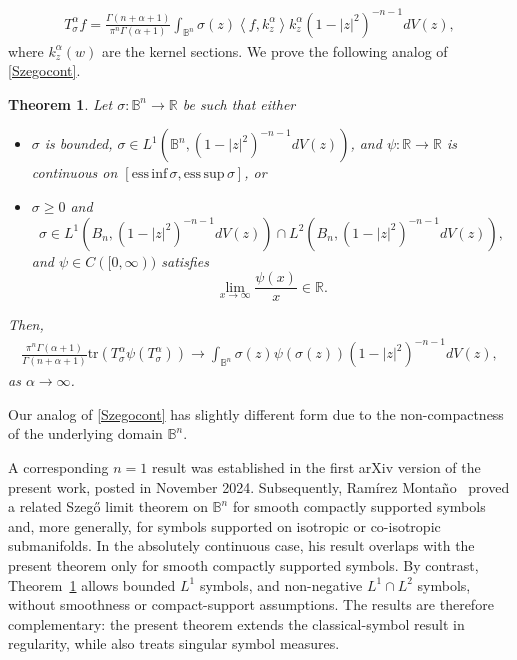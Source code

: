 \documentclass{amsart}
\newtheorem{thm}{Theorem}[section]
\theoremstyle{definition}
\theoremstyle{remark}
\numberwithin{equation}{section}
\newcommand{\ip}[2]{\left\langle {#1} , {#2} \right\rangle} %
\newcommand{\R}{\mathbb{R}} %
\newcommand{\D}{\mathbb{D}} %
\newcommand{\tr}{\text{tr}} %
\newcommand{\calF}{\mathcal{F}}
\begin{document}
\begin{align*}
    T_{\sigma}^{\alpha}f=\frac{\Gamma(n+\alpha+1)}{\pi^{n}\Gamma(\alpha+1)}\int_{\mathbb{B}^{n}}\sigma(z)\ip{f}{k_{z}^{\alpha}}k_{z}^{\alpha}(1-|z|^{2})^{-n-1}dV(z), 
\end{align*}
where $k_{z}^{\alpha}(w)$ are the kernel sections. We prove the following analog of \eqref{Szegocont}. 


\begin{thm}\label{Sze2} Let $\sigma:\mathbb{B}^{n}\to \R$ be such that either
\begin{itemize}
    \item[(a)] $\sigma$ is bounded, $\sigma\in L^{1}(\mathbb{B}^{n},(1-|z|^{2})^{-n-1}dV(z))$, and $\psi:\R \to \R$ is continuous on $[\mathrm{ess\,inf}\,\sigma,\mathrm{ess\,sup}\,\sigma]$, or 
    \item[(b)] $\sigma\geq0$ and
\[
\sigma\in
L^1\!\left(B_n,(1-|z|^2)^{-n-1}dV(z)\right)
\cap
L^2\!\left(B_n,(1-|z|^2)^{-n-1}dV(z)\right),
\]
and $\psi\in C([0,\infty))$ satisfies
\[
\lim_{x\to\infty}\frac{\psi(x)}{x}\in\mathbb{R}.
\]
\end{itemize}
Then, 
    \begin{align*}
        \frac{\pi^{n}\Gamma(\alpha+1)}{\Gamma(n+\alpha+1)}\tr\left(T_{\sigma}^{\alpha}\psi\left(T_{\sigma}^{\alpha}\right)\right)\to\int_{\mathbb{B}^{n}}\sigma(z)\psi\left(\sigma(z)\right)(1-|z|^{2})^{-n-1}dV(z),
    \end{align*}
    as $\alpha\to\infty$.
\end{thm}

\noindent Our analog of \eqref{Szegocont} has slightly different form due to the non-compactness of the underlying domain $\mathbb{B}^{n}$. 

A corresponding \(n=1\) result was established in the first arXiv
version of the present work, posted in November 2024. Subsequently,
Ram{\'i}rez Monta{\~n}o~\cite{RamirezMontano} proved a related
Szeg\H{o} limit theorem on \(\mathbb B^n\) for smooth compactly supported
symbols and, more generally, for symbols supported on isotropic or
co-isotropic submanifolds. In the absolutely continuous case, his result
overlaps with the present theorem only for smooth compactly supported
symbols. By contrast, Theorem~\ref{Sze2} allows bounded \(L^1\) symbols, and
non-negative \(L^1\cap L^2\) symbols, without smoothness or compact-support
assumptions. The results are therefore complementary: the present theorem
extends the classical-symbol result in regularity, while
\cite{RamirezMontano} also treats singular symbol measures.
\end{document}
